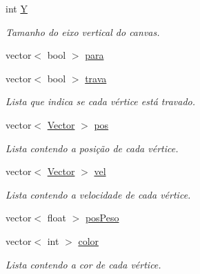 \begin{DoxyCompactItemize}
\mbox{\label{classGraphDisplay_a25ae3eec2c8103a827aefcd5a44be825}} 
int \mbox{\hyperlink{classGraphDisplay_a25ae3eec2c8103a827aefcd5a44be825}{Y}}
\begin{DoxyCompactList}\small\item\em Tamanho do eixo vertical do canvas. \end{DoxyCompactList}\item 
vector$<$ bool $>$ \mbox{\hyperlink{classGraphDisplay_aa9c12d024cc689f6be699e2028e60d83}{para}}
\item 
\mbox{\label{classGraphDisplay_a7311fa3063d875c6835829f001967b39}} 
vector$<$ bool $>$ \mbox{\hyperlink{classGraphDisplay_a7311fa3063d875c6835829f001967b39}{trava}}
\begin{DoxyCompactList}\small\item\em Lista que indica se cada vértice está travado. \end{DoxyCompactList}\item 
\mbox{\label{classGraphDisplay_ae82258bda174a54431d584c41a7a0056}} 
vector$<$ \mbox{\hyperlink{classVector}{Vector}} $>$ \mbox{\hyperlink{classGraphDisplay_ae82258bda174a54431d584c41a7a0056}{pos}}
\begin{DoxyCompactList}\small\item\em Lista contendo a posição de cada vértice. \end{DoxyCompactList}\item 
\mbox{\label{classGraphDisplay_adba96d8bb8a10d61aa8cff8de4148bd4}} 
vector$<$ \mbox{\hyperlink{classVector}{Vector}} $>$ \mbox{\hyperlink{classGraphDisplay_adba96d8bb8a10d61aa8cff8de4148bd4}{vel}}
\begin{DoxyCompactList}\small\item\em Lista contendo a velocidade de cada vértice. \end{DoxyCompactList}\item 
vector$<$ float $>$ \mbox{\hyperlink{classGraphDisplay_a5e623e031f43e01713d991c29848cd96}{pos\+Peso}}
\item 
\mbox{\label{classGraphDisplay_a4b1af3eec6797feb7cde718c3f02ce13}} 
vector$<$ int $>$ \mbox{\hyperlink{classGraphDisplay_a4b1af3eec6797feb7cde718c3f02ce13}{color}}
\begin{DoxyCompactList}\small\item\em Lista contendo a cor de cada vértice. \end{DoxyCompactList}\item 

\end{DoxyCompactItemize}
